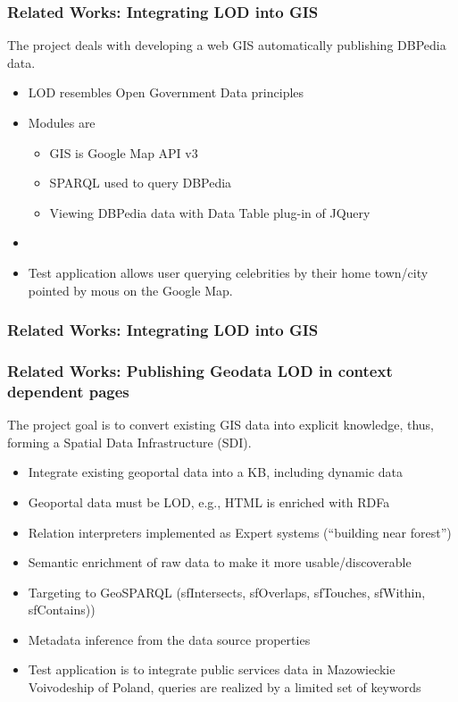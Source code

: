 \documentclass[10pt]{beamer}
\begin{document}
\begin{frame}
  \frametitle{Related Works: Integrating LOD into GIS}
  The project \cite{abid} deals with developing a web GIS automatically publishing DBPedia data.
  \begin{itemize}
  \item LOD resembles Open Government Data principles
  \item Modules are
    \begin{itemize}
    \item GIS is Google Map API v3
    \item SPARQL used to query DBPedia
    \item Viewing DBPedia data with Data Table plug-in of JQuery
    \end{itemize}
  \item
  \item Test application allows user querying celebrities by their home town/city pointed by mous on the Google Map.
  \end{itemize}
\end{frame}

\begin{frame}
  \frametitle{Related Works: Integrating LOD into GIS}
\end{frame}


\begin{frame}
  \frametitle{Related Works: Publishing Geodata LOD in context dependent pages}
  The project \cite{iwaniak17} goal is to convert existing GIS data into explicit knowledge, thus, forming a Spatial Data Infrastructure (SDI).
  \begin{itemize}
  \item Integrate existing geoportal data into a KB, including dynamic data
  \item Geoportal data must be LOD, e.g., HTML is enriched with RDFa
  \item Relation interpreters implemented as Expert systems (``building near forest'')
  \item Semantic enrichment of raw data to make it more usable/discoverable
  \item Targeting to GeoSPARQL (sfIntersects, sfOverlaps, sfTouches, sfWithin, sfContains))
  \item Metadata inference from the data source properties
  \item Test application is to integrate public services data in Mazowieckie Voivodeship of Poland, queries are realized by a limited set of keywords
  \end{itemize}
\end{frame}
\end{document}
